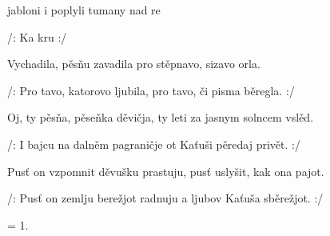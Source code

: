 


\zs



 jabloni i  poplyli tumany nad 
re

/:   Ka 
  kru  :/
\ks

\zs


Vychadila, pěsňu zavadila pro stěpnavo, sizavo orla.

/: Pro tavo, katorovo ljubila, pro tavo, či pisma běregla. :/
\ks

\zs


Oj, ty pěsňa, pěseňka děvičja, ty leti za jasnym solncem vslěd.

/: I bajcu na dalněm pagraničje ot Kaťuši pěredaj privět. :/
\ks

\zs


Pusť on vzpomnit děvušku prastuju, pusť uslyšit, kak ona pajot.

/: Pusť on zemlju berežjot radnuju a ljubov Kaťuša sběrežjot. :/
\ks

\zs
= 1.
\ks

\kp



